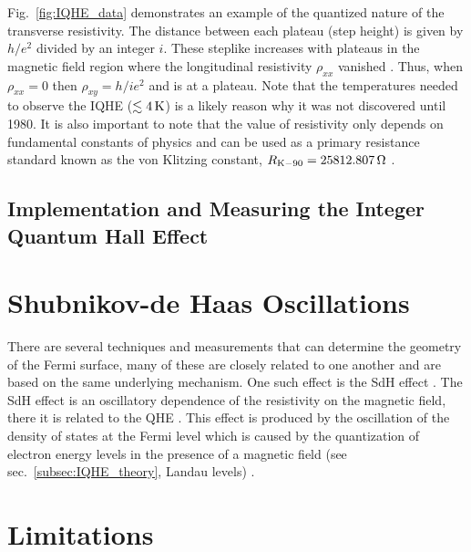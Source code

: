 Fig.~\ref{fig:IQHE_data} demonstrates an example of the quantized nature of the transverse resistivity. The distance between each plateau (step height) is given by $h/e^2$ divided by an integer $i$. These steplike increases with plateaus in the magnetic field region where the longitudinal resistivity $\rho_{xx}$ vanished \cite{Klitzing_RevModPhys1986}. Thus, when $\rho_{xx} = 0$ then $\rho_{xy} = h/i e^2$ and is at a plateau. Note that the temperatures needed to observe the \acs{IQHE} ($\lesssim 4\,\mathrm{K}$) is a likely reason why it was not discovered until 1980. It is also important to note that the value of resistivity only depends on fundamental constants of physics and can be used as a primary resistance standard known as the von Klitzing constant, $R_{\mathrm{K}-90} = 25812.807\,\mathrm{\Omega}$ \cite{Klitzing_PhysRevLett1980,Aoki_PhysRevLett1986,Bliek_Met1988}.

\subsection{Implementation and Measuring the Integer Quantum Hall Effect}\label{subsec:IQHE_measure}

\section{Shubnikov-de Haas Oscillations}\label{sec:qm_oscillations}
There are several techniques and measurements that can determine the geometry of the Fermi surface, many of these are closely related to one another and are based on the same underlying mechanism. One such effect is the \acs{SdH} effect \cite{Shubnikov_Leiden1930}. The \acs{SdH} effect is an oscillatory dependence of the resistivity on the magnetic field, there it is related to the \ac{QHE} \cite{Soule_PhysRev1964}. This effect is produced by the oscillation of the density of states at the Fermi level which is caused by the quantization of electron energy levels in the presence of a magnetic field (see sec.~\ref{subsec:IQHE_theory}, Landau levels) \cite{Peierls_ZPhys1933,Landau_RoyalSoc1939}. 

\section{Limitations}\label{sec:limitations}